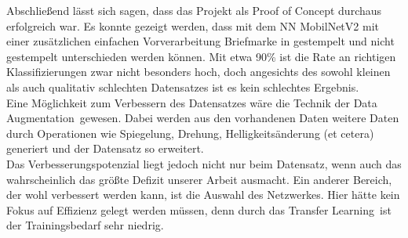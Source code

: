 \documentclass[12pt,toc=bib,toc=listof]{scrreprt}
\begin{document}
Abschließend lässt sich sagen, dass das Projekt als Proof of Concept durchaus erfolgreich war. Es konnte gezeigt werden, dass mit dem NN MobilNetV2 mit einer zusätzlichen einfachen Vorverarbeitung Briefmarke in gestempelt und nicht gestempelt unterschieden werden können. Mit etwa 90\% ist die Rate an richtigen Klassifizierungen zwar nicht besonders hoch, doch angesichts des sowohl kleinen als auch qualitativ schlechten Datensatzes ist es kein schlechtes Ergebnis.\\
Eine Möglichkeit zum Verbessern des Datensatzes wäre die Technik der \dq Data Augmentation\dq\ gewesen. Dabei werden aus den vorhandenen Daten weitere Daten durch Operationen wie Spiegelung, Drehung, Helligkeitsänderung (et cetera) generiert und der Datensatz so erweitert.\\
Das Verbesserungspotenzial liegt jedoch nicht nur beim Datensatz, wenn auch das wahrscheinlich das größte Defizit unserer Arbeit ausmacht. Ein anderer Bereich, der wohl verbessert werden kann, ist die Auswahl des Netzwerkes. Hier hätte kein Fokus auf Effizienz gelegt werden müssen, denn durch das \dq Transfer Learning\dq\ ist der Trainingsbedarf sehr niedrig. 






\appendix

 

\end{document}
